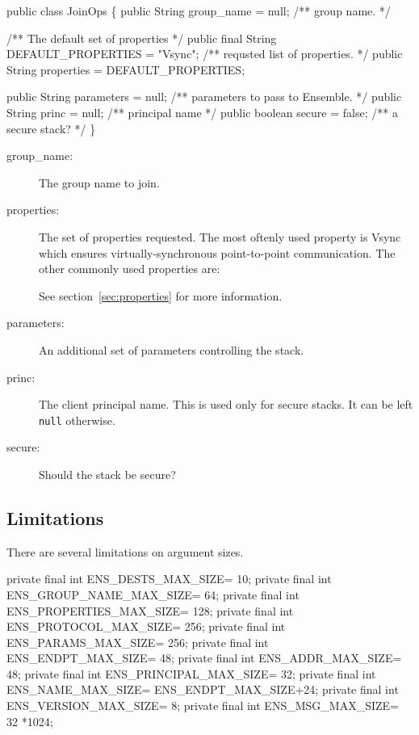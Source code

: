\begin{codebox}
public class JoinOps \{
    public String group_name = null;  /** group name.   */

    /** The default set of properties */
    public final String DEFAULT_PROPERTIES = "Vsync";
    /** requsted list of properties.  */    
    public String properties = DEFAULT_PROPERTIES; 

    public String parameters = null;  /** parameters to pass to Ensemble.  */
    public String princ = null;       /** principal name  */
    public boolean secure = false;    /** a secure stack?  */
\}
\end{codebox}

\begin{description}
\item[group\_name:] The group name to join.
\item[properties:] The set of properties requested. The most oftenly
  used property is Vsync which ensures virtually-synchronous
  point-to-point communication. The other commonly used properties
  are:

  See section~\ref{sec:properties} for more information. 

\item[parameters:]  An additional set of parameters controlling the
  stack. 
\item[princ:] The client principal name. This is used only for secure
  stacks. It can be left {\tt null} otherwise. 
\item[secure:] Should the stack be secure? 
\end{description}

\subsection{Limitations}
There are several limitations on argument sizes. 

\begin{codebox}
    private final int ENS_DESTS_MAX_SIZE=      10;
    private final int ENS_GROUP_NAME_MAX_SIZE= 64;
    private final int ENS_PROPERTIES_MAX_SIZE= 128;
    private final int ENS_PROTOCOL_MAX_SIZE=   256;
    private final int ENS_PARAMS_MAX_SIZE=     256;
    private final int ENS_ENDPT_MAX_SIZE=      48;
    private final int ENS_ADDR_MAX_SIZE=       48;
    private final int ENS_PRINCIPAL_MAX_SIZE=  32;
    private final int ENS_NAME_MAX_SIZE=       ENS_ENDPT_MAX_SIZE+24;
    private final int ENS_VERSION_MAX_SIZE=    8;
    private final int ENS_MSG_MAX_SIZE=        32 *1024;
\end{codebox}

